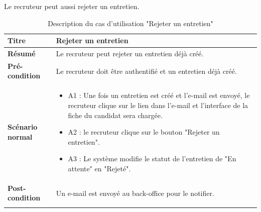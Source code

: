  Le recruteur peut aussi rejeter un entretien.
 \newpage
  \begin{longtable}[c]{
    |p{}|
    |p{}|
}
    \hline
    \textbf{Titre}
    &   Rejeter un entretien\\
    \hline
    \textbf{Résumé}
    & Le recruteur peut rejeter un entretien déjà créé. \\
    \hline
     \textbf{Pré-condition}
    & Le recruteur doit être authentifié et un entretien déjà créé.\\
    \hline
     \textbf{Scénario normal}
    & \begin{itemize}
        \item A1 : Une fois un entretien est créé et l'e-mail est envoyé, le recruteur clique sur le lien dans l'e-mail et l'interface de la fiche du candidat sera chargée. 
        \item A2 : le recruteur clique sur le bouton "Rejeter un entretien".
        \item A3 : Le système modifie le statut de l'entretien de "En attente" en "Rejeté".
    \end{itemize}\\
    \hline
    \textbf{Post-condition}
    & Un e-mail est envoyé au back-office pour le notifier.\\
    \hline
\caption{Description du cas d'utilisation "Rejeter un entretien"}
\label{tab:rejet_entretien}
\end{longtable}
